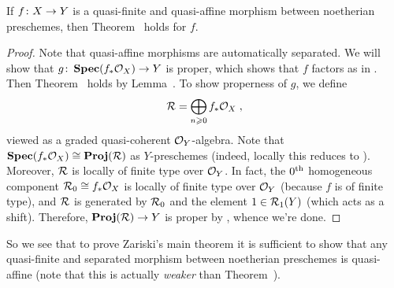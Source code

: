 \documentclass[a4paper,parskip=half,numbers=enddot, DIV=12]{scrreprt}
\renewcommand{\geq}{\geqslant}
\begin{document}
\begin{lem}
	If $f\colon X\morphism Y$ is a quasi-finite and quasi-affine morphism between noetherian preschemes, then Theorem~ holds for $f$.
\end{lem}
\begin{proof}
	Note that quasi-affine morphisms are automatically separated. We will show that $g\colon \SPEC (f_*\Oo_X)\morphism Y$ is proper, which shows that $f$ factors as in . Then Theorem~ holds by Lemma~. To show properness of $g$, we define
	\begin{align*}
		\Rr=\bigoplus_{n\geq 0}f_*\Oo_X\;,
	\end{align*}
	viewed as a graded quasi-coherent $\mathcal{O}_Y$-algebra. Note that $\operatorname{\mathbf{Spec}} (f_*\mathcal{O}_X)\cong \operatorname{\mathbf{Proj}} (\mathcal{R})$ as $Y$-preschemes (indeed, locally this reduces to \cite[Example~2.6.2]{alggeo1}). Moreover, $\mathcal{R}$ is locally of finite type over $\mathcal{O}_Y$. In fact, the $0^{\text{th}}$ homogeneous component $\mathcal{R}_0\cong f_*\mathcal{O}_X$ is locally of finite type over $\mathcal{O}_Y$ (because $f$ is of finite type), and $\mathcal{R}$ is generated by $\mathcal{R}_0$ and the element $1\in\mathcal{R}_1(Y)$ (which acts as a shift). Therefore, $\PROJ (\Rr)\morphism Y$ is proper by \cite[Proposition~2.4.2]{alggeo2}, whence we're done.
\end{proof}
So we see that to prove Zariski's main theorem it is sufficient to show that any quasi-finite and separated morphism between noetherian preschemes is quasi-affine (note that this is actually \emph{weaker} than Theorem~).
\end{document}
